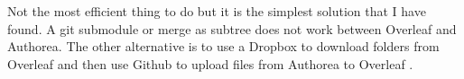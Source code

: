 Not the most efficient thing to do but it is the simplest solution that I have found. A git submodule or merge as subtree does not work between Overleaf and Authorea. The other alternative is to use a Dropbox to download folders from Overleaf and then use Github to upload files from Authorea to Overleaf \cite{Yatsko_2015}. 

